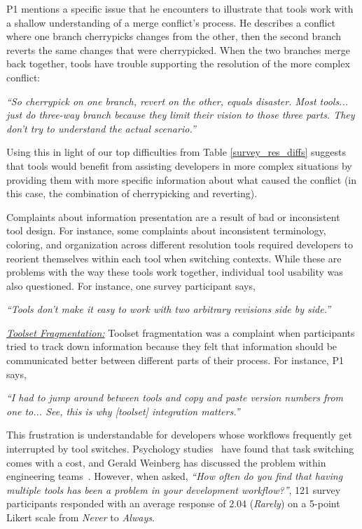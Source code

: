  P1 mentions a specific issue that he encounters to illustrate that tools work with a shallow understanding of a merge conflict's process. He describes a conflict where one branch cherrypicks changes from the other, then the second branch reverts the same changes that were cherrypicked. When the two branches merge back together, tools have trouble supporting the resolution of the more complex conflict:
 \begin{displayquote}
 \textit{``So cherrypick on one branch, revert on the other, equals disaster. Most tools... just do three-way branch because they limit their vision to those three parts. They don't try to understand the actual scenario.''}
 \end{displayquote}
 Using this in light of our top difficulties from Table \ref{survey_res_diffs} suggests that tools would benefit from assisting developers in more complex situations by providing them with more specific information about what caused the conflict (in this case, the combination of cherrypicking and reverting).

Complaints about information presentation are a result of bad or inconsistent tool design. For instance, some complaints about inconsistent terminology, coloring, and organization across different resolution tools required developers to reorient themselves within each tool when switching contexts. While these are problems with the way these tools work together, individual tool usability was also questioned. For instance, one survey participant says, 
\begin{displayquote}
\textit{``Tools don't make it easy to work with two arbitrary revisions side by side.''}
\end{displayquote}

\underline{\textit{Toolset Fragmentation:}} Toolset fragmentation was a complaint when participants tried to track down information because they felt that information should be communicated better between different parts of their process. For instance, P1 says, 

\begin{displayquote}
\textit{``I had to jump around between tools and copy and paste version numbers from one to... See, this is why [toolset] integration matters.''}
\end{displayquote}

This frustration is understandable for developers whose workflows frequently get interrupted by tool switches. Psychology studies~\cite{Meiran2000}\cite{gopher2000switching} have found that task switching comes with a cost, and Gerald Weinberg has discussed the problem within engineering teams~\cite{Weinberg1992}. However, when asked, \textit{``How often do you find that having multiple tools has been a problem in your development workflow?''}, 121 survey participants responded with an average response of 2.04 (\textit{Rarely}) on a 5-point Likert scale from \textit{Never} to \textit{Always}. 

